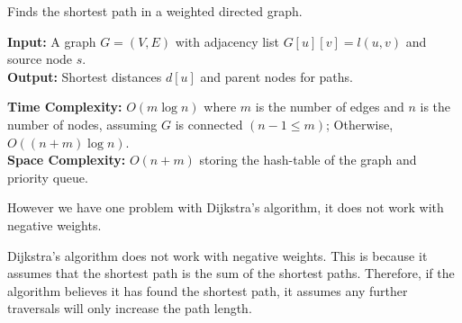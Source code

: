 \newpage
\begin{Func}

    Finds the shortest path in a weighted directed graph.

    \vspace{.5em}
    \noindent
    \textbf{Input:} A graph $G = (V, E)$ with adjacency list $G[u][v] = l(u, v)$ and source node $s$.\\
    \textbf{Output:} Shortest distances $d[u]$ and parent nodes for paths.

    \begin{algorithm}[H]
        \SetAlgoLined
    \end{algorithm}

    \noindent
    \textbf{Time Complexity:} $O(m\log n)$ where $m$ is the number of edges and $n$ is the number of nodes, assuming $G$ is connected $(n-1\leq m)$; Otherwise,
    $O((n+m)\log n)$.\\
    \textbf{Space Complexity:} $O(n+m)$ storing the hash-table of the graph and priority queue.
\end{Func}

\noindent
However we have one problem with Dijkstra's algorithm, it does not work with negative weights.
\begin{theo}
    
    Dijkstra's algorithm does not work with negative weights. This is because it assumes that the shortest path is the sum of the shortest paths. Therefore,
    if the algorithm believes it has found the shortest path, it assumes any further traversals will only increase the path length.
\end{theo}

